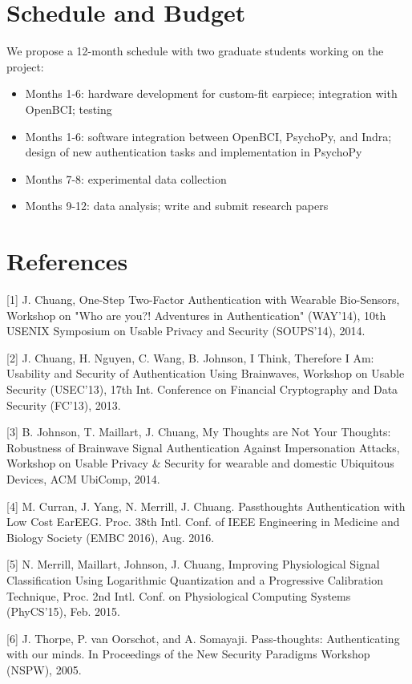 \documentclass[11pt]{article}
\begin{document}
\section{Schedule and Budget}
\label{sec:org1590dbf}
We propose a 12-month schedule with two graduate students working on the
project:

\begin{itemize}
\item Months 1-6: hardware development for custom-fit earpiece; integration with OpenBCI; testing
\item Months 1-6: software integration between OpenBCI, PsychoPy, and Indra; design of new authentication tasks and implementation in PsychoPy
\item Months 7-8: experimental data collection
\item Months 9-12: data analysis; write and submit research papers
\end{itemize}
\section{References}
\label{sec:org14ba974}

[1]
J. Chuang, One-Step Two-Factor Authentication with Wearable Bio-Sensors, Workshop on
"Who are you?! Adventures in Authentication" (WAY'14), 10th USENIX Symposium on
Usable Privacy and Security (SOUPS'14), 2014.

[2]
J. Chuang, H. Nguyen, C. Wang, B. Johnson, I Think, Therefore I Am: Usability and
Security of Authentication Using Brainwaves, Workshop on Usable Security (USEC'13),
17th Int. Conference on Financial Cryptography and Data Security (FC’13), 2013.

[3]
B. Johnson, T. Maillart, J. Chuang, My Thoughts are Not Your Thoughts: Robustness of
Brainwave Signal Authentication Against Impersonation Attacks, Workshop on Usable
Privacy \& Security for wearable and domestic Ubiquitous Devices, ACM UbiComp, 2014.

[4]
M. Curran, J. Yang, N. Merrill, J. Chuang. Passthoughts Authentication with Low Cost
EarEEG. Proc. 38th Intl. Conf. of IEEE Engineering in Medicine and Biology Society
(EMBC 2016), Aug. 2016.

[5]
N. Merrill, Maillart, Johnson, J. Chuang, Improving Physiological Signal Classification Using
Logarithmic Quantization and a Progressive Calibration Technique, Proc. 2nd Intl. Conf. on
Physiological Computing Systems (PhyCS'15), Feb. 2015.

[6]
J. Thorpe, P. van Oorschot, and A. Somayaji. Pass-thoughts: Authenticating with our
minds. In Proceedings of the New Security Paradigms Workshop (NSPW), 2005.
\end{document}
